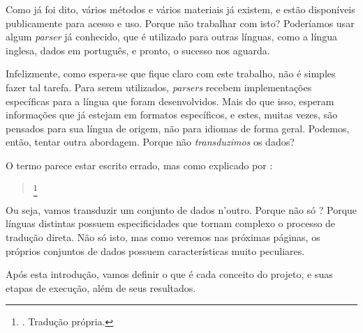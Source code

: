 Como já foi dito, vários métodos e vários materiais já existem, e estão disponíveis publicamente para acesso e uso. Porque não trabalhar com isto? Poderíamos usar algum \textit{parser} 
já conhecido, que é utilizado para outras línguas, como a língua inglesa,
dados em português, e pronto, o sucesso nos aguarda.

Infelizmente, como espera-se que fique claro com este trabalho, não é simples fazer tal tarefa. Para serem utilizados, \textit{parsers} recebem implementações específicas para a língua que foram desenvolvidos. Mais do que isso, esperam informações que já estejam em formatos específicos, e estes, muitas vezes, são pensados para sua língua de origem, não para idiomas de forma geral.
Podemos, então, tentar outra abordagem.
Porque não \textit{transduzimos} os dados?
    

O termo  parece estar escrito errado, mas como explicado por :
\begin{quote}
    \footnote{. Tradução própria.}
\end{quote}

Ou seja, vamos transduzir um conjunto de dados n’outro. Porque não só ? 
Porque línguas distintas possuem especificidades que tornam complexo o processo de tradução direta. Não só isto, mas como veremos nas próximas páginas, os próprios conjuntos de dados possuem características muito peculiares.

Após esta introdução, vamos definir o que é cada conceito do projeto, e suas etapas de execução, além de seus resultados.

